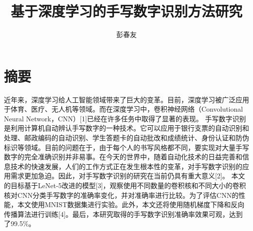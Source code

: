 \documentclass[11pt]{article}
\author{彭春友}
\date{}
\title{基于深度学习的手写数字识别方法研究}
\begin{document}
\maketitle
\tableofcontents

\section*{摘要}
\label{sec:org2a7ff7e}
近年来，深度学习给人工智能领域带来了巨大的变革。目前，深度学习被广泛应用于体育、医疗、无人机等领域。而在深度学习中，卷积神经网络（Convolutional Neural Network，CNN）[1]已经在许多任务中取得了显著的表现。
手写数字识别是利用计算机自动辨认手写数字的一种技术。它可以应用于银行支票的自动识别和处理、邮政编码的自动识别、学生答题卡的自动批改和成绩统计、身份认证和防伪标识等领域。目前的问题在于，由于每个人的书写风格都不同，要实现对大量手写数字的完全准确识别并非易事。在今天的世界中，随着自动化技术的日益完善和信息技术的快速发展，人们的工作方式正在发生根本性的变革，对手写数字识别的应用需求更加急迫。因此，对手写数字识别的研究在当前仍具有重大意义[2]。
本文的目标基于LeNet-5改进的模型[3]，观察使用不同数量的卷积核和不同大小的卷积核对CNN分类手写数字的准确率变化，并对准确率进行比较。为了评估CNN的性能，本文使用MNIST数据集进行实验。此外，本文还将使用随机梯度下降和反向传播算法进行训练[4]。最后，本研究取得的手写数字识别准确率效果可观，达到了99.5\%。
\end{document}
